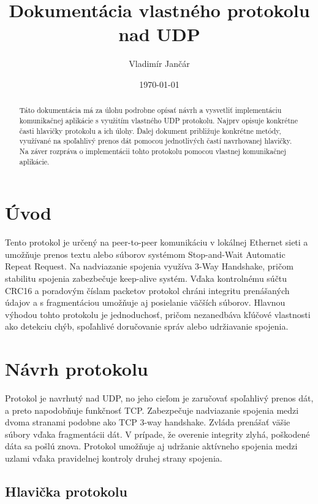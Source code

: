 \documentclass[a4paper,12pt]{article}
\title{Dokumentácia vlastného protokolu nad UDP}
\author{Vladimír Jančár}
\date{\today}
\begin{document}
\maketitle

\begin{abstract}
   Táto dokumentácia má za úlohu podrobne opísať návrh a vysvetliť implementáciu komunikačnej aplikácie s využitím vlastného UDP protokolu. Najprv opisuje konkrétne časti hlavičky protokolu a ich úlohy. Ďalej dokument približuje konkrétne metódy, využívané na spoľahlivý prenos dát pomocou jednotlivých častí navrhovanej hlavičky. Na záver rozpráva o implementácii tohto protokolu pomocou vlastnej komunikačnej aplikácie.
\end{abstract}

\tableofcontents

\section{Úvod}
	Tento protokol je určený na peer-to-peer komunikáciu v lokálnej Ethernet sieti a umožňuje prenos textu alebo súborov systémom Stop-and-Wait Automatic Repeat Request. Na nadviazanie spojenia využíva 3-Way Handshake, pričom stabilitu spojenia zabezbečuje keep-alive systém. Vďaka kontrolnému súčtu CRC16 a poradovým číslam packetov protokol chráni integritu prenášaných údajov a s fragmentáciou umožňuje aj posielanie väčších súborov. Hlavnou výhodou tohto protokolu je jednoduchosť, pričom nezanedbáva kľúčové vlastnosti ako detekciu chýb, spoľahlivé doručovanie správ alebo udržiavanie spojenia.

\section{Návrh protokolu}

    Protokol je navrhutý nad UDP, no jeho cieľom je zaručovať spoľahlivý prenos dát, a preto napodobňuje funkčnosť TCP. Zabezpečuje nadviazanie spojenia medzi dvoma stranami podobne ako TCP 3-way handshake. Zvláda prenášať väšie súbory vďaka fragmentácii dát. V prípade, že overenie integrity zlyhá, poškodené dáta sa pošlú znova. Protokol umožňuje aj udržanie aktívneho spojenia medzi uzlami vďaka pravidelnej kontroly druhej strany spojenia.


    \subsection{Hlavička protokolu}
\end{document}
